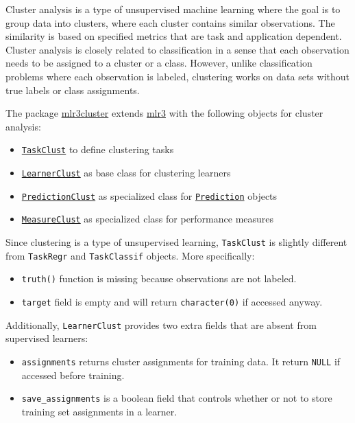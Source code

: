 \documentclass[
]{scrbook}
\providecommand{\tightlist}{%
  \setlength{\itemsep}{0pt}\setlength{\parskip}{0pt}}
\begin{document}
Cluster analysis is a type of unsupervised machine learning where the goal is to group data into clusters, where each cluster contains similar observations.
The similarity is based on specified metrics that are task and application dependent.
Cluster analysis is closely related to classification in a sense that each observation needs to be assigned to a cluster or a class.
However, unlike classification problems where each observation is labeled, clustering works on data sets without true labels or class assignments.

The package \href{https://mlr3cluster.mlr-org.com}{mlr3cluster} extends \href{https://mlr3.mlr-org.com}{mlr3} with the following objects for cluster analysis:

\begin{itemize}
\tightlist
\item
  \href{https://mlr3cluster.mlr-org.com/reference/TaskClust.html}{\texttt{TaskClust}} to define clustering tasks
\item
  \href{https://mlr3cluster.mlr-org.com/reference/LearnerClust.html}{\texttt{LearnerClust}} as base class for clustering learners
\item
  \href{https://mlr3cluster.mlr-org.com/reference/PredictionClust.html}{\texttt{PredictionClust}} as specialized class for \href{https://mlr3.mlr-org.com/reference/Prediction.html}{\texttt{Prediction}} objects
\item
  \href{https://mlr3cluster.mlr-org.com/reference/MeasureClust.html}{\texttt{MeasureClust}} as specialized class for performance measures
\end{itemize}

Since clustering is a type of unsupervised learning, \texttt{TaskClust} is slightly different from \texttt{TaskRegr} and \texttt{TaskClassif} objects.
More specifically:

\begin{itemize}
\tightlist
\item
  \texttt{truth()} function is missing because observations are not labeled.
\item
  \texttt{target} field is empty and will return \texttt{character(0)} if accessed anyway.
\end{itemize}

Additionally, \texttt{LearnerClust} provides two extra fields that are absent from supervised learners:

\begin{itemize}
\tightlist
\item
  \texttt{assignments} returns cluster assignments for training data. It return \texttt{NULL} if accessed before training.
\item
  \texttt{save\_assignments} is a boolean field that controls whether or not to store training set assignments in a learner.
\end{itemize}
\end{document}

